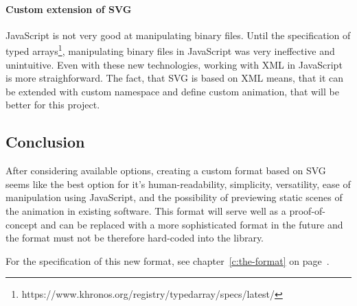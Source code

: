 \paragraph{Custom extension of SVG} JavaScript is not very good at manipulating binary files. Until the specification of typed arrays\footnote{https://www.khronos.org/registry/typedarray/specs/latest/}, manipulating binary files in JavaScript was very ineffective and unintuitive. Even with these new technologies, working with XML in JavaScript is more straighforward. The fact, that SVG is based on XML means, that it can be extended with custom namespace and define custom animation, that will be better for this project.

\subsection{Conclusion}
After considering available options, creating a custom format based on SVG seems like the best option for it's human-readability, simplicity, versatility, ease of manipulation using JavaScript, and the possibility of previewing static scenes of the animation in existing software. This format will serve well as a proof-of-concept and can be replaced with a more sophisticated format in the future and the format must not be therefore hard-coded into the library.

For the specification of this new format, see chapter~\ref{c:the-format} on page~\pageref{c:the-format}.